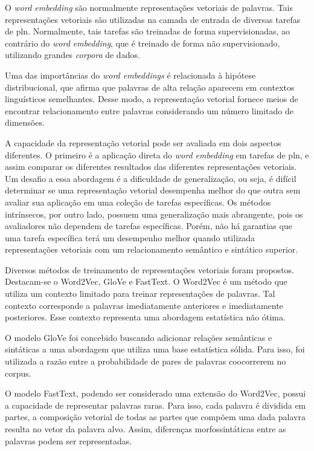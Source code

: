 O \textit{word embedding} são normalmente representações vetoriais de palavras. Tais representações vetoriais são utilizadas na camada de entrada de diversas tarefas de \gls{pln}. Normalmente, tais tarefas são treinadas de forma supervisionadas, ao contrário do \textit{word embedding}, que é treinado de forma não supervisionado, utilizando grandes \textit{corpora} de dados.

Uma das importâncias do \textit{word embeddings} é relacionada à hipótese distribucional, que afirma que palavras de alta relação aparecem em contextos linguísticos semelhantes. Desse modo, a representação vetorial fornece meios de encontrar relacionamento entre palavras considerando um número limitado de dimensões.

A capacidade da representação vetorial pode ser avaliada em dois aspectos diferentes. O primeiro é a aplicação direta do \textit{word embedding} em tarefas de \gls{pln}, e assim comparar os diferentes resultados das diferentes representações vetoriais. Um desafio a essa abordagem é a dificuldade de generalização, ou seja, é difícil determinar se uma representação vetorial desempenha melhor do que outra sem avaliar sua aplicação em uma coleção de tarefas específicas. Os métodos intrínsecos, por outro lado, possuem uma generalização mais abrangente, pois os avaliadores não dependem de tarefas específicas. Porém, não há garantias que uma tarefa específica terá um desempenho melhor quando utilizada representações vetoriais com um relacionamento semântico e sintático superior.

Diversos métodos de treinamento de representações vetoriais foram propostos. Destacam-se o Word2Vec, GloVe e FastText. O Word2Vec é um método que utiliza um contexto limitado para treinar representações de palavras. Tal contexto corresponde a palavras imediatamente anteriores e imediatamente posteriores. Esse contexto representa uma abordagem estatística não ótima.

O modelo GloVe foi concebido buscando adicionar relações semânticas e sintáticas a uma abordagem que utiliza uma base estatística sólida. Para isso, foi utilizada a razão entre a probabilidade de pares de palavras coocorrerem no corpus.

O modelo FastText, podendo ser considerado uma extensão do Word2Vec, possui a capacidade de representar palavras raras. Para isso, cada palavra é dividida em partes, a composição vetorial de todas as partes que compõem uma dada palavra resulta no vetor da palavra alvo. Assim, diferenças morfossintáticas entre as palavras podem ser representadas.

